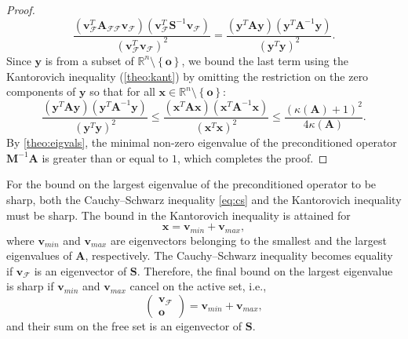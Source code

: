 \documentclass[11pt]{article}
\theoremstyle{plain}
\theoremstyle{definition}
\newcommand{\Vo}{\bm{o}}
\newcommand{\Vv}{\bm{v}}
\newcommand{\Vx}{\bm{x}}
\newcommand{\Vy}{\bm{y}}
\newcommand{\MA}{\bm{A}}
\newcommand{\MM}{\bm{M}}
\newcommand{\MS}{\bm{S}}
\begin{document}
\begin{proof}
  \begin{equation*}
    \frac{\left(\Vv_{\mathcal{F}}^{T}\MA_{\mathcal{FF}}\Vv_{\mathcal{F}}\right) \left(\Vv_{\mathcal{F}}^{T}\MS^{-1}\Vv_{\mathcal{F}}\right)}{\left(\Vv_{\mathcal{F}}^{T}\Vv_{\mathcal{F}}\right)^{2}} =
    \frac{\left(\Vy^{T}\MA\Vy\right) \left(\Vy^{T}\MA^{-1}\Vy\right)}{\left(\Vy^{T}\Vy\right)^{2}}.
  \end{equation*}
  Since $\Vy$ is from a subset of $\mathbb{R}^{n}\setminus\left\{\Vo\right\}$, we bound the last term using the Kantorovich inequality (\cref{theo:kant}) by omitting the restriction on the zero components of $\Vy$ so that for all $\Vx \in \mathbb{R}^{n} \setminus\left\{\Vo\right\}$:
  \begin{equation*}
    \frac{\left(\Vy^{T}\MA\Vy\right) \left(\Vy^{T}\MA^{-1}\Vy\right)}{\left(\Vy^{T}\Vy\right)^{2}}
    \leq \frac{\left(\Vx^{T}\MA\Vx\right) \left(\Vx^{T}\MA^{-1}\Vx\right)}{\left(\Vx^{T}\Vx\right)^{2}}
    \leq \frac{\left( \kappa\left( \MA \right) +1 \right)^{2}}{4\kappa(\MA)}.
  \end{equation*}
  By \cref{theo:eigvals}, the minimal non-zero eigenvalue of the preconditioned operator $\MM^{-1}\MA$ is greater than or equal to $1$, which completes the proof.
\end{proof}

For the bound on the largest eigenvalue of the preconditioned operator to be sharp, both the Cauchy--Schwarz inequality \eqref{eq:cs} and the Kantorovich inequality must be sharp.
The bound in the Kantorovich inequality is attained for
\begin{equation*}
  \Vx = \Vv_{min} + \Vv_{max},
\end{equation*}
where $\Vv_{min}$ and $\Vv_{max}$ are eigenvectors belonging to the smallest and the largest eigenvalues of $\MA$, respectively.
The Cauchy--Schwarz inequality becomes equality if $\Vv_{\mathcal{F}}$ is an eigenvector of $\MS$.
Therefore, the final bound on the largest eigenvalue is sharp if $\Vv_{min}$ and $\Vv_{max}$ cancel on the active set, i.e.,
\begin{equation*}
\begin{pmatrix} \Vv_{\mathcal{F}}\\ \Vo \end{pmatrix} = \Vv_{min} + \Vv_{max},
\end{equation*}
and their sum on the free set is an eigenvector of $\MS$.
\end{document}
